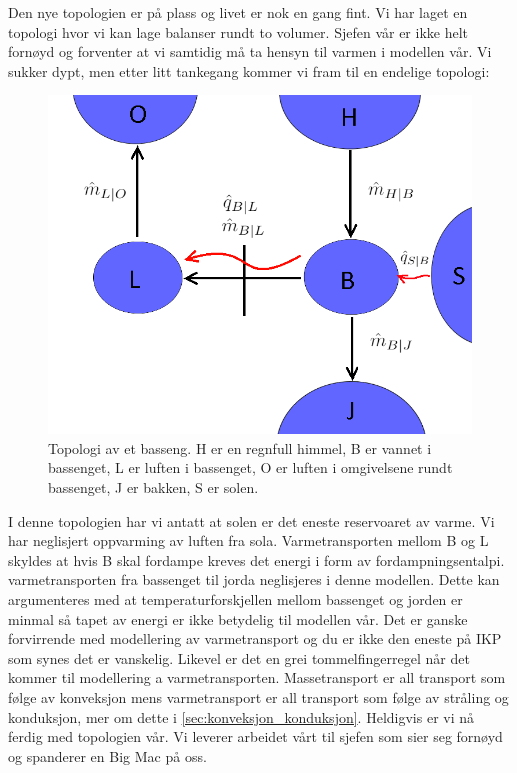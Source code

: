 Den nye topologien er på plass og livet er nok en gang fint. Vi har laget en topologi hvor vi kan lage balanser rundt to volumer. Sjefen vår er ikke helt fornøyd og forventer at vi samtidig må ta hensyn til varmen i modellen vår. Vi sukker dypt, men etter litt tankegang kommer vi fram til en endelige topologi:

\begin{figure}[H]
    \centering
    \includegraphics[scale=0.3]{Figures/Basseng3.png}
    \caption{Topologi av et basseng. H er en regnfull himmel, B er vannet i bassenget, L er luften i bassenget, O er luften i omgivelsene rundt bassenget, J er bakken, S er solen.}
    \label{fig:my_label}
\end{figure}
I denne topologien har vi antatt at solen er det eneste reservoaret av varme. Vi har neglisjert oppvarming av luften fra sola. Varmetransporten mellom B og L skyldes at hvis B skal fordampe kreves det energi i form av fordampningsentalpi. varmetransporten fra bassenget til jorda neglisjeres i denne modellen. Dette kan argumenteres med at temperaturforskjellen mellom bassenget og jorden er minmal så tapet av energi er ikke betydelig til modellen vår. Det er ganske forvirrende med modellering av varmetransport og du er ikke den eneste på IKP som synes det er vanskelig. Likevel er det en grei tommelfingerregel når det kommer til modellering a varmetransporten. Massetransport er all transport som følge av konveksjon mens varmetransport er all transport som følge av stråling og konduksjon, mer om dette i \cref{sec:konveksjon_konduksjon}. Heldigvis er vi nå ferdig med topologien vår. Vi leverer arbeidet vårt til sjefen som sier seg fornøyd og spanderer en Big Mac på oss. 

